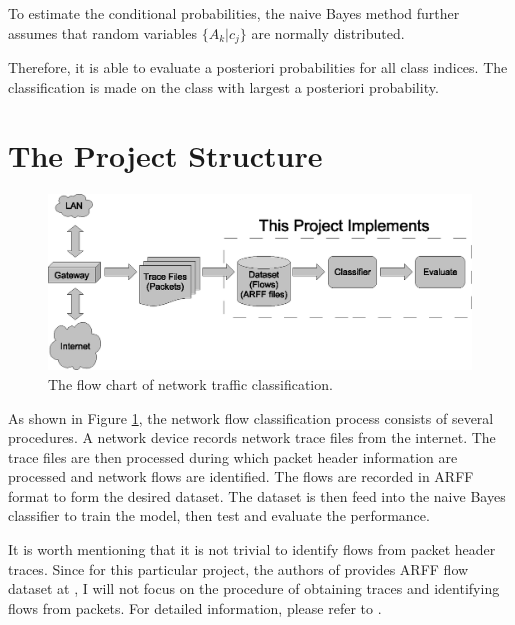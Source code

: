 \documentclass[a4paper,12pt]{article}
\begin{document}
To estimate the conditional probabilities, the naive Bayes method further assumes that random variables $\{A_k|c_j\}$ are normally distributed.

Therefore, it is able to evaluate a posteriori probabilities for all class indices. The classification is made on the class with largest a posteriori probability.

\section{The Project Structure}
\begin{figure}[tbp]
    \centering
    \includegraphics[width=1.1\textwidth]{pic/flow_chart.eps}
    \caption{The flow chart of network traffic classification.}
    \label{fig:flow_chart}
\end{figure} 

As shown in Figure \ref{fig:flow_chart}, the network flow classification process consists of several procedures. A network device records network trace files from the internet. The trace files are then processed during which packet header information are processed and network flows are identified. The flows are recorded in ARFF format to form the desired dataset. The dataset is then feed into the naive Bayes classifier to train the model, then test and evaluate the performance.

It is worth mentioning that it is not trivial to identify flows from packet header traces. Since for this particular project, the authors of \cite{moore2005itc} provides ARFF flow dataset at \cite{moore_website}, I will not focus on the procedure of obtaining traces and identifying flows from packets. For detailed information, please refer to \cite{moore2005duf}.
\end{document}
